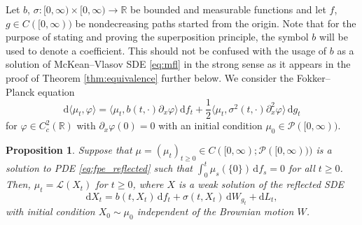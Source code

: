 \documentclass[11pt, a4paper]{article}
\theoremstyle{plain}
\newtheorem{proposition}[theorem]{Proposition}
\theoremstyle{definition}
\theoremstyle{remark}
\numberwithin{equation}{section}
\newcommand{\R}{\mathbb{R}}
\renewcommand{\P}{\mathcal{P}}
\renewcommand{\L}{\mathcal{L}}
\renewcommand{\d}{\mathrm{d}}
\newcommand{\define}{\mathpunct{:}}
\begin{document}
Let $b$, $\sigma \define [0, \infty) \times [0, \infty) \to \R$ be bounded and measurable functions and let $f$, $g \in C([0, \infty))$ be nondecreasing paths started from the origin. Note that for the purpose of stating and proving the superposition principle, the symbol $b$ will be used to denote a coefficient. This should not be confused with the usage of $b$ as a solution of McKean--Vlasov SDE \eqref{eq:mfl} in the strong sense as it appears in the proof of Theorem \ref{thm:equivalence} further below. We consider the Fokker--Planck equation
\begin{equation} \label{eq:fpe_reflected}
    \d \langle \mu_t, \varphi\rangle = \bigl\langle \mu_t, b(t, \cdot) \partial_x \varphi\bigr\rangle \, \d f_t + \frac{1}{2} \bigl\langle \mu_t, \sigma^2(t, \cdot) \partial_x^2 \varphi\bigr\rangle \, \d g_t
\end{equation}
for $\varphi \in C^2_c(\R)$ with $\partial_x \varphi(0) = 0$ with an initial condition $\mu_0 \in \P([0, \infty))$. 

\begin{proposition} \label{prop:superposition}
Suppose that $\mu = (\mu_t)_{t \geq 0} \in C([0, \infty); \P([0, \infty)))$ is a solution to PDE \eqref{eq:fpe_reflected} such that $\int_0^t \mu_s(\{0\}) \, \d f_s = 0$ for all $t \geq 0$. Then, $\mu_t = \L(X_t)$ for $t \geq 0$, where $X$ is a weak solution of the reflected SDE
\begin{equation} \label{eq:sde_super}
    \d X_t = b(t, X_t) \, \d f_t + \sigma(t, X_t) \, \d W_{g_t} + \d L_t,
\end{equation}
with initial condition $X_0 \sim \mu_0$ independent of the Brownian motion $W$.
\end{proposition}
\end{document}
